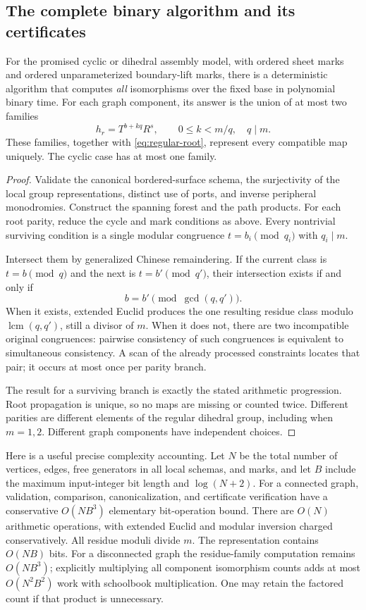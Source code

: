 \subsection{The complete binary algorithm and its certificates}

\begin{theorem}
For the promised cyclic or dihedral assembly model, with ordered sheet
marks and ordered unparameterized boundary-lift marks, there is a
deterministic algorithm that computes \emph{all} isomorphisms over the
fixed base in polynomial binary time.
For each graph component, its answer is the union of at most two
families
\[
 h_r=T^{b+kq}R^s,\qquad
 0\le k<m/q,\quad q\mid m.
\]
These families, together with \eqref{eq:regular-root}, represent every
compatible map uniquely.  The cyclic case has at most one family.
\end{theorem}
\begin{proof}
Validate the canonical bordered-surface schema, the surjectivity of the
local group representations, distinct use of ports, and inverse peripheral
monodromies.  Construct the spanning forest and the path products.
For each root parity, reduce the cycle and mark conditions as above.
Every nontrivial surviving condition is a single modular congruence
$t=b_i\pmod{q_i}$ with $q_i\mid m$.

Intersect them by generalized Chinese remaindering.  If the current class
is $t=b\pmod q$ and the next is $t=b'\pmod{q'}$, their intersection exists
if and only if
\[
 b=b'\pmod{\gcd(q,q')}.
\]
When it exists, extended Euclid produces the one resulting residue
class modulo $\operatorname{lcm}(q,q')$, still a divisor of $m$.
When it does not, there are two incompatible original congruences:
pairwise consistency of such congruences is equivalent to simultaneous
consistency.  A scan of the already processed constraints locates that
pair; it occurs at most once per parity branch.

The result for a surviving branch is exactly the stated arithmetic
progression.  Root propagation is unique, so no maps are missing or
counted twice.  Different parities are different elements of the regular
dihedral group, including when $m=1,2$.  Different graph components have
independent choices.
\end{proof}

Here is a useful precise complexity accounting.  Let $N$ be the total
number of vertices, edges, free generators in all local schemas, and marks,
and let $B$ include the maximum input-integer bit length and $\log(N+2)$.
For a connected graph, validation, comparison, canonicalization, and
certificate verification have a conservative $O(NB^3)$ elementary
bit-operation bound.  There are $O(N)$ arithmetic operations, with
extended Euclid and modular inversion charged conservatively.  All
residue moduli divide $m$.  The representation contains $O(NB)$ bits.
For a disconnected graph the residue-family computation remains
$O(NB^3)$; explicitly multiplying all component isomorphism counts adds
at most $O(N^2B^2)$ work with schoolbook multiplication.  One may retain
the factored count if that product is unnecessary.

